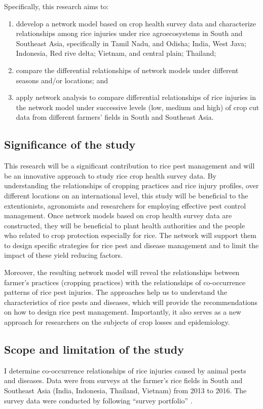 Specifically, this research aims to:
\begin{enumerate}
\item ddevelop a network model based on crop health survey data and characterize relationships among rice injuries under rice agroecosystems in South and Southeast Asia, specifically in Tamil Nadu, and Odisha; India, West Java; Indonesia, Red rive delta; Vietnam, and central plain; Thailand;
\item compare the differential relationships of network models under different seasons and/or locations; and
\item apply network analysis to compare differential relationships of rice injuries in the network model under successive levels (low, medium and high) of crop cut data from different farmers' fields in South and Southeast Asia.
\end{enumerate}

\subsection{Significance of the study}

This research will be a significant contribution to rice pest management and will be an innovative approach to study rice crop health survey data. By understanding the relationships of cropping practices and rice injury profiles, over different locations on an international level, this study will be beneficial to the extentionists, agronomists and researchers for employing effective pest control management. Once network models based on crop health survey data are constructed, they will be beneficial to plant health authorities and the people who related to crop protection especially for rice. The network will support them to design specific strategies for rice pest and disease management and to limit the impact of these yield reducing factors. 

Moreover, the resulting network model will reveal the relationships between farmer’s practices (cropping practices) with the relationships of co-occurrence patterns of rice pest injuries. The approaches help us to understand the characteristics of  rice pests and diseases, which will provide the recommendations on how to design rice pest management. Importantly, it also serves as a new approach for researchers on the subjects of crop losses and epidemiology. 

\subsection{Scope and limitation of the study}

I determine co-occurrence relationships of rice injuries caused by animal pests and diseases. Data were from  surveys at the farmer's rice fields in South and Southeast Asia (India, Indonesia, Thailand, Vietnam) from 2013 to 2016. The survey data were conducted by following ``survey portfolio'' \citep{Savary_2009_Survey}.
